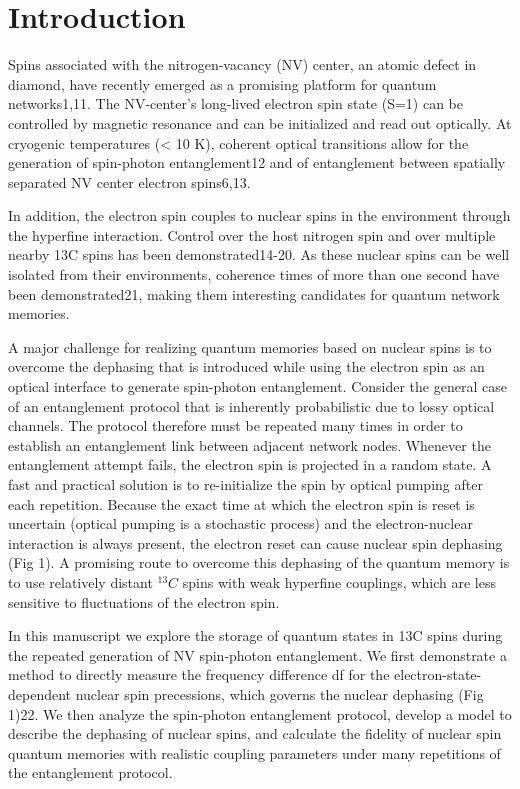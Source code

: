 \section{Introduction}

Spins associated with the nitrogen-vacancy (NV) center, an atomic defect in diamond, have recently emerged as a promising platform for quantum networks1,11. The NV-center’s long-lived electron spin state (S=1) can be controlled by magnetic resonance and can be initialized and read out optically. At cryogenic temperatures (< 10 K), coherent optical transitions allow for the generation of spin-photon entanglement12 and of entanglement between spatially separated NV center electron spins6,13. 

In addition, the electron spin couples to nuclear spins in the environment through the hyperfine interaction. Control over the host nitrogen spin and over multiple nearby 13C spins has been demonstrated14-20. As these nuclear spins can be well isolated from their environments, coherence times of more than one second have been demonstrated21, making them interesting candidates for quantum network memories. 

A major challenge for realizing quantum memories based on nuclear spins is to overcome the dephasing that is introduced while using the electron spin as an optical interface to generate spin-photon entanglement. Consider the general case of an entanglement protocol that is inherently probabilistic due to lossy optical channels. The protocol therefore must be repeated many times in order to establish an entanglement link between adjacent network nodes. Whenever the entanglement attempt fails, the electron spin is projected in a random state. A fast and practical solution is to re-initialize the spin by optical pumping after each repetition. Because the exact time at which the electron spin is reset is uncertain (optical pumping is a stochastic process) and the electron-nuclear interaction is always present, the electron reset can cause nuclear spin dephasing (Fig 1). A promising route to overcome this dephasing of the quantum memory is to use relatively distant $^{13}C$ spins with weak hyperfine couplings, which are less sensitive to fluctuations of the electron spin.  

In this manuscript we explore the storage of quantum states in 13C spins during the repeated generation of NV spin-photon entanglement. We first demonstrate a method to directly measure the frequency difference df for the electron-state-dependent nuclear spin precessions, which governs the nuclear dephasing (Fig 1)22. We then analyze the spin-photon entanglement protocol, develop a model to describe the dephasing of nuclear spins, and calculate the fidelity of nuclear spin quantum memories with realistic coupling parameters under many repetitions of the entanglement protocol. 


